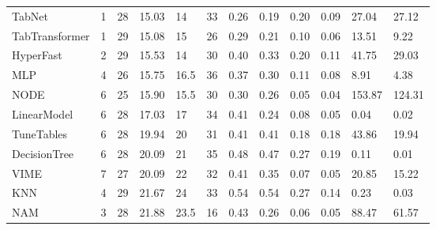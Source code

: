 \begin{tabular}{lllllrllllll}
TabNet & 1 & 28 & 15.03 & 14 & 33 & 0.26 & 0.19 & 0.20 & 0.09 & 27.04 & 27.12 \\
TabTransformer & 1 & 29 & 15.08 & 15 & 26 & 0.29 & 0.21 & 0.10 & 0.06 & 13.51 & 9.22 \\
HyperFast & 2 & 29 & 15.53 & 14 & 30 & 0.40 & 0.33 & 0.20 & 0.11 & 41.75 & 29.03 \\
MLP & 4 & 26 & 15.75 & 16.5 & 36 & 0.37 & 0.30 & 0.11 & 0.08 & 8.91 & 4.38 \\
NODE & 6 & 25 & 15.90 & 15.5 & 30 & 0.30 & 0.26 & 0.05 & 0.04 & 153.87 & 124.31 \\
LinearModel & 6 & 28 & 17.03 & 17 & 34 & 0.41 & 0.24 & 0.08 & 0.05 & 0.04 & 0.02 \\
TuneTables & 6 & 28 & 19.94 & 20 & 31 & 0.41 & 0.41 & 0.18 & 0.18 & 43.86 & 19.94 \\
DecisionTree & 6 & 28 & 20.09 & 21 & 35 & 0.48 & 0.47 & 0.27 & 0.19 & 0.11 & 0.01 \\
VIME & 7 & 27 & 20.09 & 22 & 32 & 0.41 & 0.35 & 0.07 & 0.05 & 20.85 & 15.22 \\
KNN & 4 & 29 & 21.67 & 24 & 33 & 0.54 & 0.54 & 0.27 & 0.14 & 0.23 & 0.03 \\
NAM & 3 & 28 & 21.88 & 23.5 & 16 & 0.43 & 0.26 & 0.06 & 0.05 & 88.47 & 61.57 \\
\bottomrule
\end{tabular}
